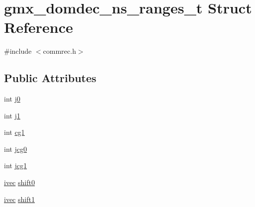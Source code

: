 \hypertarget{structgmx__domdec__ns__ranges__t}{\section{gmx\-\_\-domdec\-\_\-ns\-\_\-ranges\-\_\-t \-Struct \-Reference}
\label{structgmx__domdec__ns__ranges__t}
}


{\ttfamily \#include $<$commrec.\-h$>$}

\subsection*{\-Public \-Attributes}
\begin{DoxyCompactItemize}
\item 
int \hyperlink{structgmx__domdec__ns__ranges__t_a909a126d0f0cf432f4ef4e832203d034}{j0}
\item 
int \hyperlink{structgmx__domdec__ns__ranges__t_a33a04f07075fe56a87b73daf3965ecf7}{j1}
\item 
int \hyperlink{structgmx__domdec__ns__ranges__t_ad6f9ed1c8de218c050e157e0316a78c0}{cg1}
\item 
int \hyperlink{structgmx__domdec__ns__ranges__t_ad974facd27855b12fab8b1687e52db4d}{jcg0}
\item 
int \hyperlink{structgmx__domdec__ns__ranges__t_a0856f11fc2acbc2a1bdb0590dae459f7}{jcg1}
\item 
\hyperlink{share_2template_2gromacs_2types_2simple_8h_a74f6ffdb4a9c1764f5293969d8c681b6}{ivec} \hyperlink{structgmx__domdec__ns__ranges__t_a637687ab45958a2d82b43731aaa29b32}{shift0}
\item 
\hyperlink{share_2template_2gromacs_2types_2simple_8h_a74f6ffdb4a9c1764f5293969d8c681b6}{ivec} \hyperlink{structgmx__domdec__ns__ranges__t_af01050b694d84e0ee9ed11ea7971f876}{shift1}
\end{DoxyCompactItemize}


